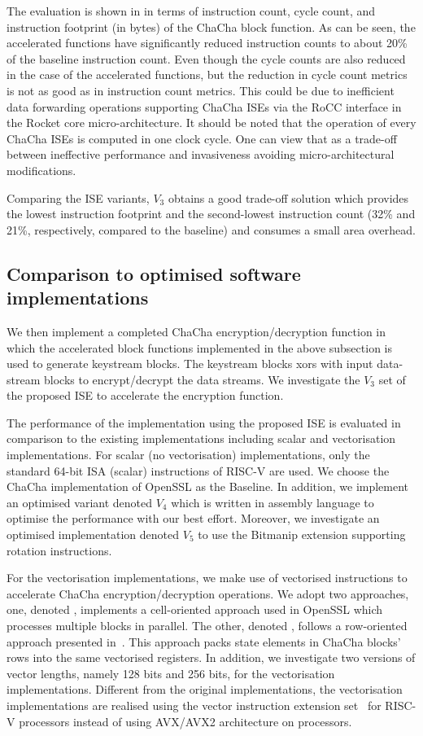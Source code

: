 The evaluation is shown in  in terms of instruction count, cycle count, and instruction footprint (in bytes) of the ChaCha block function. As can be seen, the accelerated functions have significantly reduced instruction counts to about 20\% of the baseline instruction count. Even though the cycle counts are also reduced in the case of the accelerated functions, but the reduction in cycle count metrics is not as good as in instruction count metrics. This could be due to inefficient data forwarding operations supporting ChaCha ISEs via the RoCC interface in the Rocket core micro-architecture. It should be noted that the operation of every ChaCha ISEs is computed in one clock cycle. One can view that as a trade-off between ineffective performance and invasiveness avoiding micro-architectural modifications.

Comparing the ISE variants, $V_3$ obtains a good trade-off solution which provides the lowest instruction footprint and the second-lowest instruction count (32\% and 21\%, respectively, compared to the baseline) and consumes a small area overhead.

\subsection{Comparison to optimised software implementations}
We then implement a completed ChaCha encryption/decryption function in which the accelerated block functions implemented in the above subsection is used to generate keystream blocks. The keystream blocks xors with input data-stream blocks to encrypt/decrypt the data streams. We investigate the $V_3$ set of the proposed ISE to accelerate the encryption function. 

The performance of the implementation using the proposed ISE is evaluated in comparison to the existing implementations including scalar and vectorisation implementations.  
For scalar (no vectorisation) implementations, only the standard 64-bit ISA (scalar) instructions of RISC-V are used. We choose the ChaCha implementation of OpenSSL as the Baseline. In addition, we implement an optimised variant denoted $V_4$ which is written in assembly language to optimise the performance with our best effort. Moreover, we investigate an optimised implementation denoted $V_5$ to use the Bitmanip extension supporting rotation instructions.

For the vectorisation implementations, we make use of vectorised instructions to accelerate ChaCha encryption/decryption operations. 
We adopt two approaches, one, denoted , implements a cell-oriented approach used in OpenSSL which processes multiple blocks in parallel.
The other, denoted , follows a row-oriented approach presented in~\cite{GolGue:14}. This approach packs state elements in ChaCha blocks' rows into the same vectorised registers.
In addition, we investigate two versions of vector lengths, namely 128 bits and 256 bits, for the vectorisation implementations. 
Different from the original implementations, the vectorisation implementations are realised using the vector instruction extension set~\cite{riscv:ext:vector:draft} for RISC-V processors instead of using AVX/AVX2 architecture on  processors.

